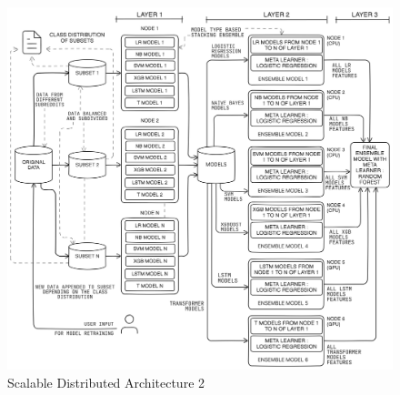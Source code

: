 \begin{figure}[h!]  
    \centering
    \includegraphics[width=1.0\textwidth]{Images/Distributed2.png}  
    \caption{Scalable Distributed Architecture 2}
    \label{lstm archi}  %
\end{figure}


